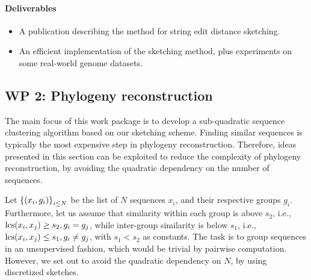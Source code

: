 \paragraph{Deliverables}
\begin{itemize}
\item A publication describing the method for string edit distance sketching. 
\item An efficient implementation of the sketching method, plus experiments on some real-world genome datasets.
\end{itemize}


\subsection{WP 2: Phylogeny reconstruction}
The main focus of this work package is to develop a sub-quadratic sequence clustering algorithm based on our sketching scheme. Finding similar sequences is typically the most expensive step in phylogeny reconstruction. Therefore, ideas presented in this section can be exploited to reduce the complexity of phylogeny reconstruction, by avoiding the quadratic dependency on the number of sequences. 

Let $ \left\{(x_i,g_i)\right\}_{i\le N}$ be the list of $N$ sequences $x_i$, and their respective groups $g_i$. Furthermore, let us assume that similarity within each group is above $s_2$, i.e., $\operatorname{\mathrm{lcs}}(x_i,x_j)\ge s_2, g_i=g_j$, while inter-group similarity is below $s_1$, i.e., $\operatorname{\mathrm{lcs}}(x_i, x_j)\le s_1, g_i \neq g_j$, with $s_1 < s_2$ as constants. The task is to group sequences in an unsupervised fashion, which would be trivial by pairwise computation. However, we set out to avoid the quadratic dependency on $N$, by using discretized sketches. 

